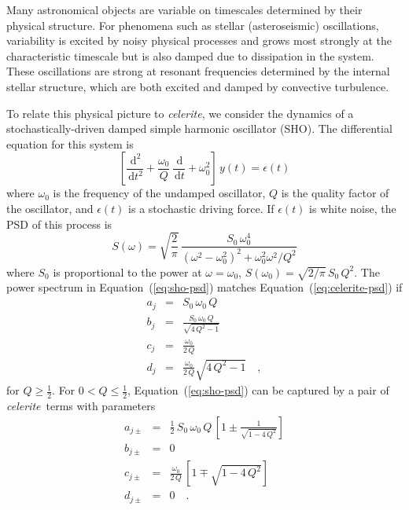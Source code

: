 \documentclass[manuscript, letterpaper]{aastex6}
\newcommand{\celeriteterm}{\emph{celerite}}
\renewcommand{\eqref}[1]{\ref{eq:#1}}
\newcommand{\Eq}[1]{Equation~(\eqref{#1})}
\newcommand{\eq}[1]{\Eq{#1}}
\newcommand{\eqlabel}[1]{\label{eq:#1}}
\newcommand{\dd}{\ensuremath{\,\mathrm{d}}}
\begin{document}
Many astronomical objects are variable on timescales determined by their
physical structure.
For phenomena such as stellar (asteroseismic) oscillations, variability is
excited by noisy physical processes and grows most strongly at the
characteristic timescale but is also damped due to dissipation in the system.
These oscillations are strong at resonant frequencies determined by the
internal stellar structure, which are both excited and damped by convective
turbulence.

To relate this physical picture to \celeriteterm, we consider the dynamics of a
stochastically-driven damped simple harmonic oscillator (SHO).
The differential equation for this system is
\begin{equation}
    \left[\frac{\dd^2}{\dd t^2} + \frac{\omega_0}{Q}\,\frac{\dd}{\dd t}
    + \omega_0^2\right]\, y(t) = \epsilon(t)
\end{equation}
where $\omega_0$ is the frequency of the undamped oscillator, $Q$ is the
quality factor of the oscillator, and $\epsilon(t)$ is a stochastic driving
force.
If $\epsilon(t)$ is white noise, the PSD of this process is
\citep{Anderson:1990}
\begin{equation}\eqlabel{sho-psd}
S(\omega) = \sqrt{\frac{2}{\pi}}\,\frac{S_0\,\omega_0^4}
    {(\omega^2-\omega_0^2)^2 + \omega_0^2\omega^2/Q^2}
\end{equation}
where $S_0$ is proportional to the power at $\omega = \omega_0$, $S(\omega_0)
= \sqrt{2/\pi}\,S_0\,Q^2$.
The power spectrum in \eq{sho-psd} matches \eq{celerite-psd} if
\begin{eqnarray}\eqlabel{sho-complex}
a_j &=& S_0\,\omega_0\,Q \\
b_j &=& \frac{S_0\,\omega_0\,Q}{\sqrt{4\,Q^2-1}} \\
c_j &=& \frac{\omega_0}{2\,Q}\\
d_j &=& \frac{\omega_0}{2\,Q} \sqrt{4\,Q^2-1} \quad,
\end{eqnarray}
for $Q \ge \frac{1}{2}$.
For $0 < Q \le \frac{1}{2}$, \eq{sho-psd} can be captured by a pair of
\celeriteterm\
terms with parameters
\begin{eqnarray}\eqlabel{sho-real}
a_{j\pm} &=& \frac{1}{2}\,S_0\,\omega_0\,Q\,\left[ 1 \pm
        \frac{1}{\sqrt{1-4\,Q^2}}\right] \\
b_{j\pm} &=& 0 \nonumber\\
    c_{j\pm} &=& \frac{\omega_0}{2\,Q}\,\left[1 \mp \sqrt{1-4\,Q^2}\right]
    \nonumber\\
d_{j\pm} &=& 0 \quad. \nonumber
\end{eqnarray}
\end{document}
